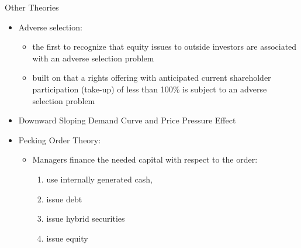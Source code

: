 \documentclass{beamer}
\begin{document}
	\begin{frame}{Other Theories}
		\begin{itemize}\tiny
			\item Adverse selection: 
			\begin{itemize}
				\tiny
				\item \cite{myers1984corporate} the first to recognize that equity issues to outside investors are associated with an adverse selection problem
				\item \cite{ECKBO1992293}  built on that a rights
				offering with anticipated current shareholder participation (take-up) of less than 100\% is subject to an adverse selection problem
			\end{itemize}
			\item  Downward Sloping Demand Curve and Price Pressure
			Effect
			\item  Pecking Order Theory:
			\begin{itemize}
				\tiny \item  Managers finance
				the needed capital with respect to the order:\begin{enumerate}\tiny
					\item use internally generated cash, \item issue
					debt \item issue hybrid securities \item issue equity
				\end{enumerate}
			\end{itemize}
		\end{itemize}
	\end{frame}
	
	
	
\end{document}
